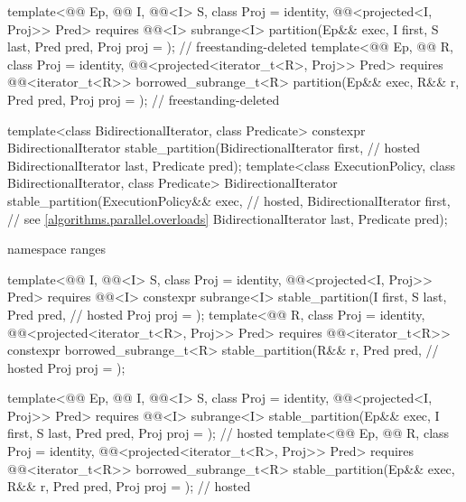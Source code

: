 \begin{codeblock}
{{    template<@@ Ep, @@ I, @@<I> S,
             class Proj = identity, @@<projected<I, Proj>> Pred>
      requires @@<I>
      subrange<I>
        partition(Ep&& exec, I first, S last, Pred pred, Proj proj = {});   // freestanding-deleted
    template<@@ Ep, @@ R, class Proj = identity,
             @@<projected<iterator_t<R>, Proj>> Pred>
      requires @@<iterator_t<R>>
      borrowed_subrange_t<R>
        partition(Ep&& exec, R&& r, Pred pred, Proj proj = {});             // freestanding-deleted
  }

  template<class BidirectionalIterator, class Predicate>
    constexpr BidirectionalIterator stable_partition(BidirectionalIterator first,   // hosted
                                                     BidirectionalIterator last,
                                                     Predicate pred);
  template<class ExecutionPolicy, class BidirectionalIterator, class Predicate>
    BidirectionalIterator stable_partition(ExecutionPolicy&& exec,                  // hosted,
                                           BidirectionalIterator first,             // see \ref{algorithms.parallel.overloads}
                                           BidirectionalIterator last,
                                           Predicate pred);

  namespace ranges {
    template<@@ I, @@<I> S, class Proj = identity,
             @@<projected<I, Proj>> Pred>
      requires @@<I>
      constexpr subrange<I> stable_partition(I first, S last, Pred pred,            // hosted
                                             Proj proj = {});
    template<@@ R, class Proj = identity,
             @@<projected<iterator_t<R>, Proj>> Pred>
      requires @@<iterator_t<R>>
      constexpr borrowed_subrange_t<R> stable_partition(R&& r, Pred pred,           // hosted
                                                        Proj proj = {});

    template<@@ Ep, @@ I, @@<I> S,
             class Proj = identity, @@<projected<I, Proj>> Pred>
      requires @@<I>
      subrange<I>
        stable_partition(Ep&& exec, I first, S last, Pred pred,
                         Proj proj = {});                                   // hosted
    template<@@ Ep, @@ R, class Proj = identity,
             @@<projected<iterator_t<R>, Proj>> Pred>
      requires @@<iterator_t<R>>
      borrowed_subrange_t<R>
        stable_partition(Ep&& exec, R&& r, Pred pred, Proj proj = {});      // hosted
  }

}
\end{codeblock}
